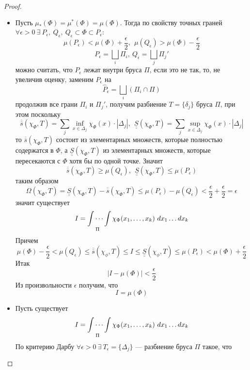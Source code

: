 \begin{proof}\tab
    \begin{itemize}
        \item[$(\Rightarrow)$:] Пусть $\mu_*(\Phi)=\mu^*(\Phi)=\mu(\Phi)$. Тогда по свойству точных граней\\
        $\forall \epsilon>0\ \exists\ P_{\epsilon},\ Q_{\epsilon},\ Q_{\epsilon}\subset \Phi\subset P_{\epsilon}$:
        \[\mu(P_{\epsilon})<\mu(\Phi)+\frac{\epsilon}{2},\ \ \mu(Q_{\epsilon})>\mu(\Phi)-\frac{\epsilon}{2}\]
        \[P_{\epsilon}=\bigsqcup\limits_i \Pi_i,\ Q_{\epsilon}=\bigsqcup\limits_j \Pi_j'\]
        можно считать, что $P_{\epsilon}$ лежат внутри бруса $\Pi$, если это не так, то, не увеличив оценку, заменим $P_{\epsilon}$ на
        \[\widehat{P}_{\epsilon}=\bigsqcup\limits_{i} (\Pi_i\cap \Pi)\]
        продолжив все грани $\Pi_i$ и $\Pi_j'$, получим разбиение $T=\{\delta_j\}$ бруса $\Pi$, при этом поскольку
        \[\overline{\overline{s}}(\chi_{\Phi},T)=\sum\limits_{j}\inf\limits_{x\in \Delta_j}\chi_{\Phi}(x)\cdot |\Delta_j|,\ \ \underline{\underline{S}}(\chi_{\Phi},T)=\sum\limits_{j}\sup\limits_{x\in \Delta_j}\chi_{\Phi}(x)\cdot |\Delta_j|\]
        то $\overline{\overline{s}}(\chi_{\Phi},T)$ состоит из элементарных множеств, которые полностью содержатся в $\Phi$, а $\underline{\underline{S}}(\chi_{\Phi},T)$ из элементарных множеств, которые пересекаются с $\Phi$ хотя бы по одной точке. Значит 
        \[\overline{\overline{s}}(\chi_{\Phi}, T)\geq \mu(Q_{\epsilon}),\ \ \underline{\underline{S}}(\chi_{\Phi}, T)\leq \mu(P_{\epsilon})\]
        таким образом
        \[\Omega(\chi_{\Phi}, T)=\underline{\underline{S}}(\chi_{\Phi}, T)-\overline{\overline{s}}(\chi_{\Phi}, T)\leq \mu(P_{\epsilon})-\mu(Q_{\epsilon})<\frac{\epsilon}{2}+\frac{\epsilon}{2}=\epsilon\]
        значит существует
        \[I=\idotsint\limits_{\Pi} \chi_{\Phi}(x_1,\dots,x_k)\ dx_1\dots dx_k\]
        Причем
        \[\mu(\Phi)-\frac{\epsilon}{2}<\mu(Q_{\epsilon})\leq \overline{\overline{s}}(\chi_{\phi}, T)\leq I\leq \underline{\underline{S}}(\chi_{\phi}, T)\leq \mu(P_{\epsilon})<\mu(\Phi)+\frac{\epsilon}{2}\]
        Итак
        \[|I-\mu(\Phi)|<\frac{\epsilon}{2}\]
        Из произвольности $\epsilon$ получим, что
        \[I=\mu(\Phi)\]
        \item[$(\Leftarrow)$:] Пусть существует 
        \[I=\idotsint\limits_{\Pi} \chi_{\Phi}(x_1,\dots,x_k)\ dx_1\dots dx_k\] 
        По критерию Дарбу $\forall \epsilon>0\ \exists\ T_{\epsilon}=\{\Delta_j\}$ --- разбиение бруса $\Pi$ такое, что

\end{itemize}
\end{proof}
